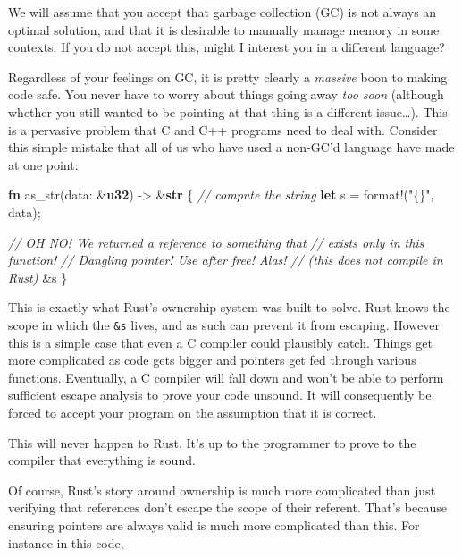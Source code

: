 \documentclass[a4paper,]{book}
\newenvironment{Shaded}{\begin{snugshade}}{\end{snugshade}}
\newcommand{\KeywordTok}[1]{\textcolor[rgb]{0.13,0.29,0.53}{\textbf{{#1}}}}
\newcommand{\StringTok}[1]{\textcolor[rgb]{0.31,0.60,0.02}{{#1}}}
\newcommand{\CommentTok}[1]{\textcolor[rgb]{0.56,0.35,0.01}{\textit{{#1}}}}
\newcommand{\OtherTok}[1]{\textcolor[rgb]{0.56,0.35,0.01}{{#1}}}
\newcommand{\NormalTok}[1]{{#1}}
\begin{document}
We will assume that you accept that garbage collection (GC) is not
always an optimal solution, and that it is desirable to manually manage
memory in some contexts. If you do not accept this, might I interest you
in a different language?

Regardless of your feelings on GC, it is pretty clearly a \emph{massive}
boon to making code safe. You never have to worry about things going
away \emph{too soon} (although whether you still wanted to be pointing
at that thing is a different issue\ldots{}). This is a pervasive problem
that C and C++ programs need to deal with. Consider this simple mistake
that all of us who have used a non-GC'd language have made at one point:

\begin{Shaded}
\begin{Highlighting}[]
\KeywordTok{fn} \NormalTok{as_str(data: &}\KeywordTok{u32}\NormalTok{) -> &}\KeywordTok{str} \NormalTok{\{}
    \CommentTok{// compute the string}
    \KeywordTok{let} \NormalTok{s = }\OtherTok{format!}\NormalTok{(}\StringTok{"\{\}"}\NormalTok{, data);}

    \CommentTok{// OH NO! We returned a reference to something that}
    \CommentTok{// exists only in this function!}
    \CommentTok{// Dangling pointer! Use after free! Alas!}
    \CommentTok{// (this does not compile in Rust)}
    \NormalTok{&s}
\NormalTok{\}}
\end{Highlighting}
\end{Shaded}

This is exactly what Rust's ownership system was built to solve. Rust
knows the scope in which the \texttt{\&s} lives, and as such can prevent
it from escaping. However this is a simple case that even a C compiler
could plausibly catch. Things get more complicated as code gets bigger
and pointers get fed through various functions. Eventually, a C compiler
will fall down and won't be able to perform sufficient escape analysis
to prove your code unsound. It will consequently be forced to accept
your program on the assumption that it is correct.

This will never happen to Rust. It's up to the programmer to prove to
the compiler that everything is sound.

Of course, Rust's story around ownership is much more complicated than
just verifying that references don't escape the scope of their referent.
That's because ensuring pointers are always valid is much more
complicated than this. For instance in this code,
\end{document}

